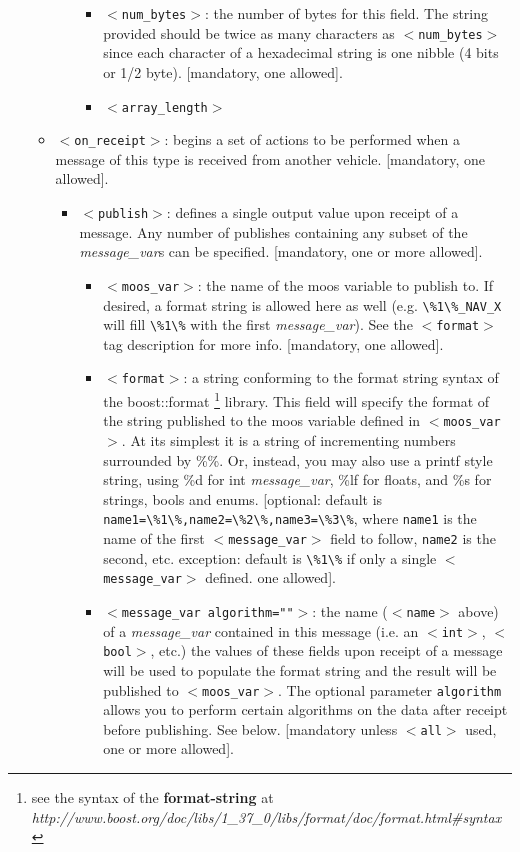 \documentclass[11pt, letterpaper, oneside]{memoir}
\newcommand{\xmltag}[1]{\texttt{$<$#1$>$}}
\begin{document}
\begin{itemize}
\begin{itemize}
\begin{itemize}
\begin{itemize}
\item \xmltag{num\_bytes}: the number of bytes for this field. The string provided should be twice as many characters as \xmltag{num\_bytes} since each character of a hexadecimal string is one nibble (4 bits or 1/2 byte). [mandatory, one allowed].
\item \xmltag{array\_length}
\end{itemize}
\end{itemize}
\item \xmltag{on\_receipt}: begins a set of actions to be performed when a message of this type is received from another vehicle. [mandatory, one allowed].
\begin{itemize}
\item \xmltag{publish}: defines a single output value upon receipt of a message. Any number of publishes containing any subset of the \textit{message\_var}s can be specified. [mandatory, one or more allowed].
\begin{itemize}
\item \xmltag{moos\_var}: the name of the moos variable to publish to. If desired, a format string is allowed here as well (e.g. \verb|\%1\%_NAV_X| will fill \verb|\%1\%| with the first \textit{message\_var}). See the \xmltag{format} tag description for more info. [mandatory, one allowed].
\item \xmltag{format}: a string conforming to the format string syntax of the boost::format \footnote{see the syntax of the \textbf{format-string} at \textit{http://www.boost.org/doc/libs/1\_37\_0/libs/format/doc/format.html\#syntax}} library. This field will specify the format of the string published to the moos variable defined in \xmltag{moos\_var}. At its simplest it is a string of incrementing numbers surrounded by \%\%. Or, instead, you may also use a printf style string, using \%d for int  \textit{message\_var}, \%lf for floats, and \%s for strings, bools and enums. [optional: default is \verb|name1=\%1\%,name2=\%2\%,name3=\%3\%|, where \verb|name1| is the name of the first \xmltag{message\_var} field to follow, \verb|name2| is the second, etc. exception: default is \verb|\%1\%| if only a single \xmltag{message\_var} defined. one allowed].
\item \xmltag{message\_var algorithm=""}: the name (\xmltag{name} above) of a \textit{message\_var} contained in this message (i.e. an \xmltag{int}, \xmltag{bool}, etc.) the values of these fields upon receipt of a message will be used to populate the format string and the result will be published to \xmltag{moos\_var}. The optional parameter \verb|algorithm| allows you to perform certain algorithms on the data after receipt before publishing. See below. [mandatory unless \xmltag{all} used, one or more allowed].

\end{itemize}
\end{itemize}
\end{itemize}
\end{itemize}
\end{document}
